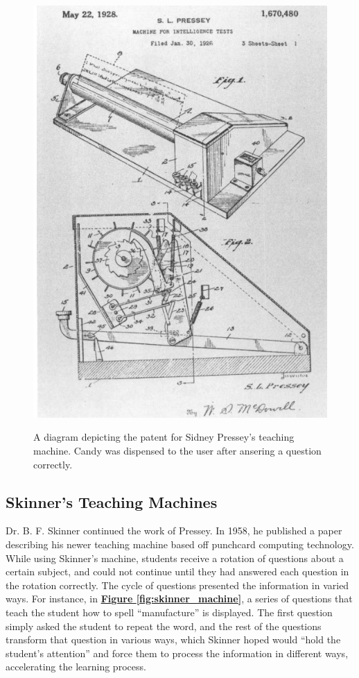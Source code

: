  \begin{figure}[h]
 	\includegraphics[width=1.0\linewidth]{figures/pressey_machine}
 	\caption{A diagram depicting the patent for Sidney Pressey's teaching machine. Candy was dispensed to the user after ansering a question correctly.}
 	\label{fig:pressey_machine}
 	\cite{benjamin1988history}
 \end{figure}
 
 \subsection{Skinner's Teaching Machines}
 \par Dr. B. F. Skinner continued the work of Pressey. In 1958, he published a paper describing his newer teaching machine based off punchcard computing technology. While using Skinner's machine, students receive a rotation of questions about a certain subject, and could not continue until they had answered each question in the rotation correctly. The cycle of questions presented the information in varied ways. For instance, in \textbf{\hyperref[fig:skinner_machine]{Figure \ref*{fig:skinner_machine}}}, a series of questions that teach the student how to spell ``manufacture'' is displayed. The first question simply asked the student to repeat the word, and the rest of the questions transform that question in various ways, which Skinner hoped would ``hold the student's attention'' and force them to process the information in different ways, accelerating the learning process. 
 
